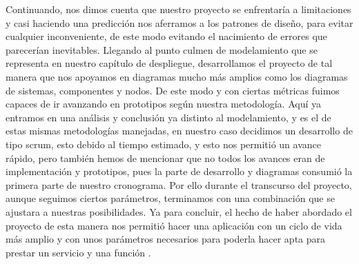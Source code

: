 \newline
\newline
Continuando, nos dimos cuenta que nuestro proyecto se enfrentaría a limitaciones y casi haciendo una predicción nos aferramos a los patrones de diseño, para evitar cualquier inconveniente, de este modo evitando el nacimiento de errores que parecerían inevitables. 
\newline
\newline
Llegando al punto culmen de modelamiento que se representa en nuestro capítulo de despliegue, desarrollamos el proyecto de tal manera que nos apoyamos en diagramas mucho más amplios como los diagramas de sistemas, componentes y nodos. De este modo y con ciertas métricas fuimos capaces de ir avanzando en prototipos según nuestra metodología. 
Aquí ya entramos en una análisis y conclusión ya distinto al modelamiento, y es el de estas mismas metodologías manejadas, en nuestro caso decidimos un desarrollo de tipo scrum, esto debido al tiempo estimado, y esto nos permitió un avance rápido, pero también hemos de mencionar que no todos los avances eran de implementación y prototipos, pues la parte de desarrollo y diagramas consumió la primera parte de nuestro cronograma.  Por ello durante el transcurso del proyecto, aunque seguimos ciertos parámetros, terminamos con una combinación que se ajustara a nuestras posibilidades. 
\newline
Ya para concluir, el hecho de haber abordado el proyecto de esta manera nos permitió hacer una aplicación con un ciclo de vida más amplio y con unos parámetros necesarios para poderla hacer apta para prestar un servicio y una función .   

